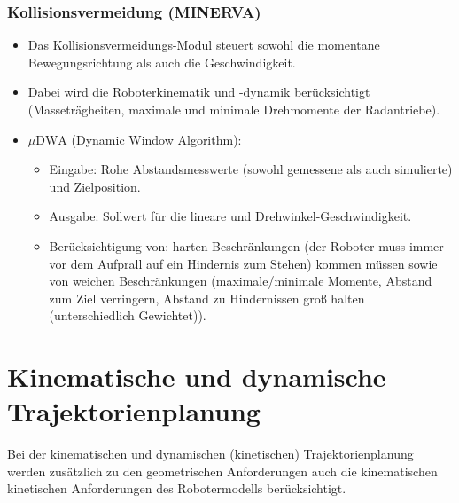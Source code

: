 			\subsubsection{Kollisionsvermeidung (MINERVA)}
				\begin{itemize}
					\item Das Kollisionsvermeidungs-Modul steuert sowohl die momentane Bewegungsrichtung als auch die Geschwindigkeit.
					\item Dabei wird die Roboterkinematik und -dynamik berücksichtigt (Masseträgheiten, maximale und minimale Drehmomente der Radantriebe).
					\item \(\mu\text{DWA}\) (Dynamic Window Algorithm):
						\begin{itemize}
							\item Eingabe: Rohe Abstandsmesswerte (sowohl gemessene als auch simulierte) und Zielposition.
							\item Ausgabe: Sollwert für die lineare und Drehwinkel-Geschwindigkeit.
							\item Berücksichtigung von: harten Beschränkungen (der Roboter muss immer vor dem Aufprall auf ein Hindernis zum Stehen) kommen müssen sowie von weichen Beschränkungen (maximale/minimale Momente, Abstand zum Ziel verringern, Abstand zu Hindernissen groß halten (unterschiedlich Gewichtet)).
						\end{itemize}
				\end{itemize}

	\section{Kinematische und dynamische Trajektorienplanung}
		Bei der kinematischen und dynamischen (kinetischen) Trajektorienplanung werden zusätzlich zu den geometrischen Anforderungen auch die kinematischen \bzw kinetischen Anforderungen des Robotermodells berücksichtigt.


